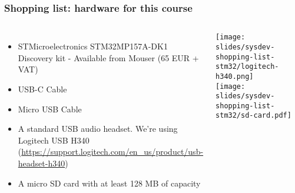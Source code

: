 \begin{frame}
\frametitle{Shopping list: hardware for this course}
  \begin{columns}
    \footnotesize
    \begin{itemize}
      \item STMicroelectronics STM32MP157A-DK1 Discovery kit -
        Available from Mouser (65 EUR + VAT)
      \item USB-C Cable
      \item Micro USB Cable
      \item A standard USB audio headset. We're using Logitech USB H340
	    (\url{https://support.logitech.com/en_us/product/usb-headset-h340})
      \item A micro SD card with at least 128 MB of capacity
    \end{itemize}
    \texttt{[image: slides/sysdev-shopping-list-stm32/logitech-h340.png]} \\
    \vspace{1cm}
    \texttt{[image: slides/sysdev-shopping-list-stm32/sd-card.pdf]}
  \end{columns}
\end{frame}
